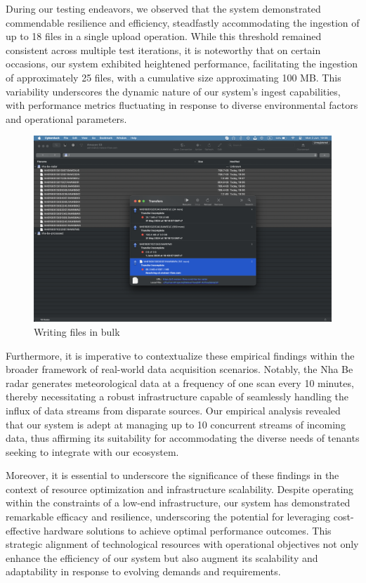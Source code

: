 During our testing endeavors, we observed that the system demonstrated
commendable resilience and efficiency, steadfastly accommodating the ingestion
of up to 18 files in a single upload operation. While this threshold remained
consistent across multiple test iterations, it is noteworthy that on certain
occasions, our system exhibited heightened performance, facilitating the
ingestion of approximately 25 files, with a cumulative size approximating 100
MB. This variability underscores the dynamic nature of our system's ingest
capabilities, with performance metrics fluctuating in response to diverse
environmental factors and operational parameters.

\begin{figure}[ht]
    \centering
    \includegraphics[width=0.8\linewidth]{Images/5-upload-18-files.png}
    \vspace{1cm}
    \caption{Writing files in bulk}
    \label{fig:bulk-write}
\end{figure}

Furthermore, it is imperative to contextualize these empirical findings within
the broader framework of real-world data acquisition scenarios. Notably, the Nha
Be radar generates meteorological data at a frequency of one scan every 10
minutes, thereby necessitating a robust infrastructure capable of seamlessly
handling the influx of data streams from disparate sources. Our empirical
analysis revealed that our system is adept at managing up to 10 concurrent
streams of incoming data, thus affirming its suitability for accommodating the
diverse needs of tenants seeking to integrate with our ecosystem.

Moreover, it is essential to underscore the significance of these findings in
the context of resource optimization and infrastructure scalability. Despite
operating within the constraints of a low-end infrastructure, our system has
demonstrated remarkable efficacy and resilience, underscoring the potential for
leveraging cost-effective hardware solutions to achieve optimal performance
outcomes. This strategic alignment of technological resources with operational
objectives not only enhance the efficiency of our system but also augment its
scalability and adaptability in response to evolving demands and requirements.


